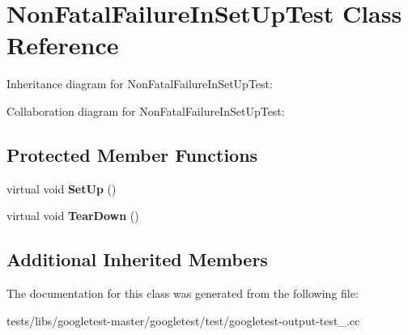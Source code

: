 \hypertarget{classNonFatalFailureInSetUpTest}{}\section{Non\+Fatal\+Failure\+In\+Set\+Up\+Test Class Reference}
\label{classNonFatalFailureInSetUpTest}


Inheritance diagram for Non\+Fatal\+Failure\+In\+Set\+Up\+Test\+:


Collaboration diagram for Non\+Fatal\+Failure\+In\+Set\+Up\+Test\+:
\subsection*{Protected Member Functions}
\begin{DoxyCompactItemize}
\item 
\mbox{\label{classNonFatalFailureInSetUpTest_ae24c724bae1fcd2601f58fa9c26adca3}} 
virtual void {\bfseries Set\+Up} ()
\item 
\mbox{\label{classNonFatalFailureInSetUpTest_a36abc808b11afc6a9bfa20dac5c28c30}} 
virtual void {\bfseries Tear\+Down} ()
\end{DoxyCompactItemize}
\subsection*{Additional Inherited Members}


The documentation for this class was generated from the following file\+:\begin{DoxyCompactItemize}
\item 
tests/libs/googletest-\/master/googletest/test/googletest-\/output-\/test\+\_\+.\+cc\end{DoxyCompactItemize}
